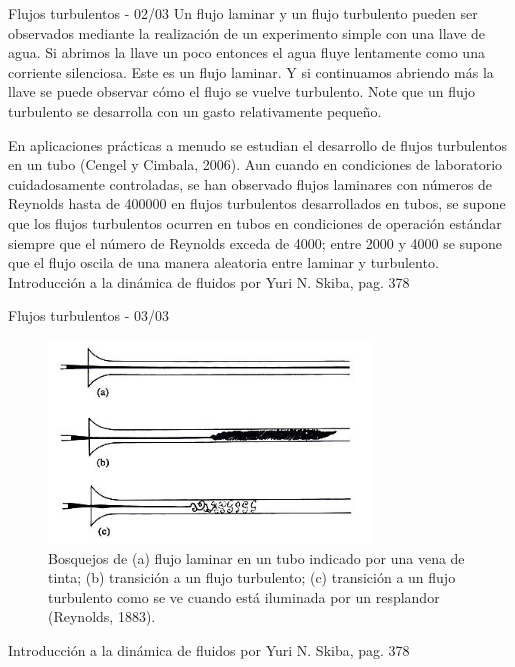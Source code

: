 \begin{frame}{Flujos turbulentos - 02/03}
\justifying
Un flujo laminar y un flujo turbulento pueden ser observados mediante la realización de un experimento simple con una llave de agua. Si abrimos la llave un poco entonces el agua fluye lentamente como una corriente silenciosa. Este es un flujo laminar. Y si continuamos abriendo más la llave se puede observar cómo el flujo se vuelve turbulento. Note que un flujo turbulento se desarrolla con un gasto relativamente pequeño.

En aplicaciones prácticas a menudo se estudian el desarrollo de flujos turbulentos en un tubo (Cengel y Cimbala, 2006). Aun cuando en condiciones de laboratorio cuidadosamente controladas, se han observado flujos laminares con números de Reynolds hasta de 400000 en flujos turbulentos desarrollados en tubos, se supone que los flujos turbulentos ocurren en tubos en condiciones de operación estándar siempre que el número de Reynolds exceda de 4000; entre 2000 y 4000 se supone que el flujo oscila de una manera aleatoria entre laminar y turbulento.\\
{\tiny Introducción a la dinámica de fluidos por Yuri N. Skiba, pag. 378}
\end{frame}

\begin{frame}{Flujos turbulentos - 03/03}
\justifying
\begin{figure}[H]
\centering
\includegraphics[scale=0.4]{Section_Files/S2-imagenes-Jhon/Book-IMF/01.png}
\caption{Bosquejos de (a) flujo laminar en un tubo indicado por una vena de tinta;
(b) transición a un flujo turbulento; (c) transición a un flujo turbulento como se ve cuando está iluminada por un resplandor (Reynolds, 1883).}
\end{figure}
{\tiny Introducción a la dinámica de fluidos por Yuri N. Skiba, pag. 378}
\end{frame}

